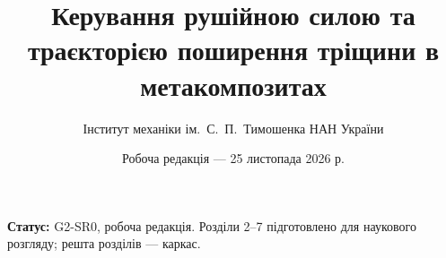 \documentclass[12pt,a4paper,oneside]{report}
\title{Керування рушійною силою та траєкторією поширення тріщини в метакомпозитах}
\author{Інститут механіки ім.~С.~П.~Тимошенка НАН України}
\date{Робоча редакція --- 25 листопада 2026 р.}
\begin{document}
\maketitle
\noindent\textbf{Статус:} G2-SR0, робоча редакція. Розділи 2--7 підготовлено для наукового розгляду; решта розділів --- каркас.
\tableofcontents









\ifreportbibliography
  \printbibliography[heading=bibintoc,title={Список використаних джерел}]
\fi
% 
\end{document}
